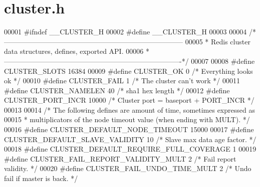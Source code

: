 \hypertarget{cluster_8h_source}{}\section{cluster.\+h}
\label{cluster_8h_source}

\begin{DoxyCode}
00001 \textcolor{preprocessor}{#}\textcolor{preprocessor}{ifndef} \textcolor{preprocessor}{\_\_CLUSTER\_H}
00002 \textcolor{preprocessor}{#}\textcolor{preprocessor}{define} \textcolor{preprocessor}{\_\_CLUSTER\_H}
00003 
00004 \textcolor{comment}{/*-----------------------------------------------------------------------------}
00005 \textcolor{comment}{ * Redis cluster data structures, defines, exported API.}
00006 \textcolor{comment}{ *----------------------------------------------------------------------------*/}
00007 
00008 \textcolor{preprocessor}{#}\textcolor{preprocessor}{define} \textcolor{preprocessor}{CLUSTER\_SLOTS} 16384
00009 \textcolor{preprocessor}{#}\textcolor{preprocessor}{define} \textcolor{preprocessor}{CLUSTER\_OK} 0          \textcolor{comment}{/* Everything looks ok */}
00010 \textcolor{preprocessor}{#}\textcolor{preprocessor}{define} \textcolor{preprocessor}{CLUSTER\_FAIL} 1        \textcolor{comment}{/* The cluster can't work */}
00011 \textcolor{preprocessor}{#}\textcolor{preprocessor}{define} \textcolor{preprocessor}{CLUSTER\_NAMELEN} 40    \textcolor{comment}{/* sha1 hex length */}
00012 \textcolor{preprocessor}{#}\textcolor{preprocessor}{define} \textcolor{preprocessor}{CLUSTER\_PORT\_INCR} 10000 \textcolor{comment}{/* Cluster port = baseport + PORT\_INCR */}
00013 
00014 \textcolor{comment}{/* The following defines are amount of time, sometimes expressed as}
00015 \textcolor{comment}{ * multiplicators of the node timeout value (when ending with MULT). */}
00016 \textcolor{preprocessor}{#}\textcolor{preprocessor}{define} \textcolor{preprocessor}{CLUSTER\_DEFAULT\_NODE\_TIMEOUT} 15000
00017 \textcolor{preprocessor}{#}\textcolor{preprocessor}{define} \textcolor{preprocessor}{CLUSTER\_DEFAULT\_SLAVE\_VALIDITY} 10 \textcolor{comment}{/* Slave max data age factor. */}
00018 \textcolor{preprocessor}{#}\textcolor{preprocessor}{define} \textcolor{preprocessor}{CLUSTER\_DEFAULT\_REQUIRE\_FULL\_COVERAGE} 1
00019 \textcolor{preprocessor}{#}\textcolor{preprocessor}{define} \textcolor{preprocessor}{CLUSTER\_FAIL\_REPORT\_VALIDITY\_MULT} 2 \textcolor{comment}{/* Fail report validity. */}
00020 \textcolor{preprocessor}{#}\textcolor{preprocessor}{define} \textcolor{preprocessor}{CLUSTER\_FAIL\_UNDO\_TIME\_MULT} 2 \textcolor{comment}{/* Undo fail if master is back. */}

\end{DoxyCode}
